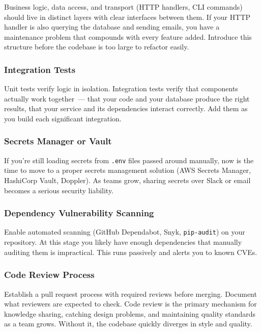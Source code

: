 Business logic, data access, and transport (HTTP handlers, CLI commands) should live in distinct layers with clear interfaces between them. If your HTTP handler is also querying the database and sending emails, you have a maintenance problem that compounds with every feature added. Introduce this structure before the codebase is too large to refactor easily.

\subsubsection*{Integration Tests}\label{writing-good-code:integration-tests}

Unit tests verify logic in isolation. Integration tests verify that components actually work together~--- that your code and your database produce the right results, that your service and its dependencies interact correctly. Add them as you build each significant integration.

\subsubsection*{Secrets Manager or Vault}\label{writing-good-code:secrets-manager-or-vault}

If you're still loading secrets from \texttt{.env} files passed around manually, now is the time to move to a proper secrets management solution (AWS Secrets Manager, HashiCorp Vault, Doppler). As teams grow, sharing secrets over Slack or email becomes a serious security liability.

\subsubsection*{Dependency Vulnerability Scanning}\label{writing-good-code:dependency-vulnerability-scanning}

Enable automated scanning (GitHub Dependabot, Snyk, \texttt{pip-audit}) on your repository. At this stage you likely have enough dependencies that manually auditing them is impractical. This runs passively and alerts you to known CVEs.

\subsubsection*{Code Review Process}\label{writing-good-code:code-review-process}

Establish a pull request process with required reviews before merging. Document what reviewers are expected to check. Code review is the primary mechanism for knowledge sharing, catching design problems, and maintaining quality standards as a team grows. Without it, the codebase quickly diverges in style and quality.

